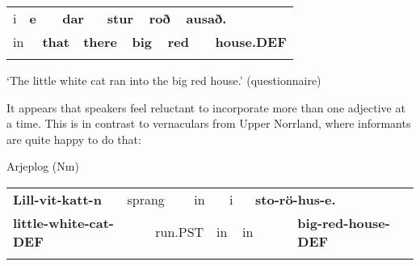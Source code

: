\begin{tabular}{llllllllllll}
\lsptoprule
i & \multicolumn{2}{l}{{\bfseries e}

} & \multicolumn{2}{l}{{\bfseries dar}

} & \multicolumn{2}{l}{{\bfseries stur}

} & \multicolumn{2}{l}{{\bfseries roð}

} & \multicolumn{2}{l}{{\bfseries ausað.}

} & \\
\multicolumn{2}{l}{in

} & \multicolumn{2}{l}{{\bfseries that}

} & \multicolumn{2}{l}{{\bfseries there}

} & \multicolumn{2}{l}{{\bfseries big}

} & \multicolumn{2}{l}{{\bfseries red}

} & \multicolumn{2}{l}{{\bfseries house.DEF}

}\\
\lspbottomrule
\end{tabular}

\begin{styleTranslation}
‘The little white cat ran into the big red house.’ (questionnaire)

\end{styleTranslation}

\begin{styleBodyTextFirst}
It appears that speakers feel reluctant to incorporate more than one adjective at a time. This is in contrast to vernaculars from Upper Norrland, where informants are quite happy to do that:

\end{styleBodyTextFirst}

\begin{listWWNumileveli}
\item {}

\begin{styleExample}
Arjeplog (Nm)

\end{styleExample}

\end{listWWNumileveli}

\begin{tabular}{llllllllll}
\lsptoprule
{\bfseries Lill-vit-katt-n} & \multicolumn{2}{l}{sprang

} & \multicolumn{2}{l}{in

} & \multicolumn{2}{l}{i

} & \multicolumn{2}{l}{{\bfseries sto-rö-hus-e.}

} & \\
\multicolumn{2}{l}{{\bfseries little-white-cat-DEF}

} & \multicolumn{2}{l}{run.PST

} & \multicolumn{2}{l}{in

} & \multicolumn{2}{l}{in

} & \multicolumn{2}{l}{{\bfseries big-red-house-DEF}

}\\
\lspbottomrule
\end{tabular}

